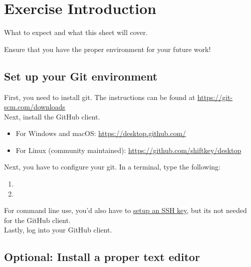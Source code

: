 \documentclass[paper=a4]{scrartcl}
\newcommand{\theexercisenumber}{1} %
\newcommand{\thedate}{27.09.2023} %
\begin{document}
\date{\thedate}
\exercise{\theexercisenumber}

\parskip 8pt
\makesheetheader

\section*{Exercise Introduction}
What to expect and what this sheet will cover.

\tableofcontents

\bigskip


Ensure that you have the proper environment for your future work!

\subsection*{Set up your Git environment}

First, you need to install git. The instructions can be found at \href{https://git-scm.com/downloads}{\url{https://git-scm.com/downloads}}\\

Next, install the GitHub client.
\begin{itemize}
  \item For Windows and macOS: \href{https://desktop.github.com/}{\url{https://desktop.github.com/}}
  \item For Linux (community maintained): \href{https://github.com/shiftkey/desktop}{\url{https://github.com/shiftkey/desktop}}
\end{itemize}

Next, you have to configure your git. In a terminal, type the following:
\begin{enumerate}
	\item {}
  \item {}
\end{enumerate}

For command line use, you'd also have to \href{https://docs.github.com/en/authentication/connecting-to-github-with-ssh}{setup an SSH key}, but its not needed for the GitHub client.\\

Lastly, log into your GitHub client.

\subsection*{Optional: Install a proper text editor}
\end{document}
